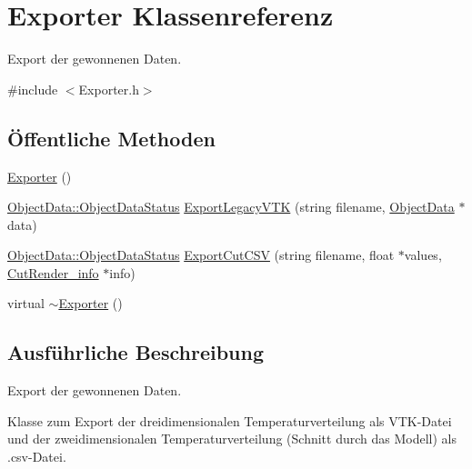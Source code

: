 \hypertarget{classExporter}{\section{Exporter Klassenreferenz}
\label{classExporter}
}


Export der gewonnenen Daten.  




{\ttfamily \#include $<$Exporter.\-h$>$}

\subsection*{Öffentliche Methoden}
\begin{DoxyCompactItemize}
\item 
\hyperlink{classExporter_a2a977cb5ac8f637fcb570e73f650eca0}{Exporter} ()
\item 
\hyperlink{classObjectData_a20e8cd3cd0f8af3b571b9393aa9e6484}{Object\-Data\-::\-Object\-Data\-Status} \hyperlink{classExporter_a59d03f0a582498e15397230b70ad1e80}{Export\-Legacy\-V\-T\-K} (string filename, \hyperlink{classObjectData}{Object\-Data} $\ast$data)
\item 
\hyperlink{classObjectData_a20e8cd3cd0f8af3b571b9393aa9e6484}{Object\-Data\-::\-Object\-Data\-Status} \hyperlink{classExporter_ae2aa06b8c8c77e172801a1f77800ffd0}{Export\-Cut\-C\-S\-V} (string filename, float $\ast$values, \hyperlink{structUtils_1_1CutRender__info}{Cut\-Render\-\_\-info} $\ast$info)
\item 
virtual \hyperlink{classExporter_a44f24686958e01a543fd8b68b392658a}{$\sim$\-Exporter} ()
\end{DoxyCompactItemize}


\subsection{Ausführliche Beschreibung}
Export der gewonnenen Daten. 

Klasse zum Export der dreidimensionalen Temperaturverteilung als V\-T\-K-\/\-Datei und der zweidimensionalen Temperaturverteilung (Schnitt durch das Modell) als .csv-\/\-Datei. 

